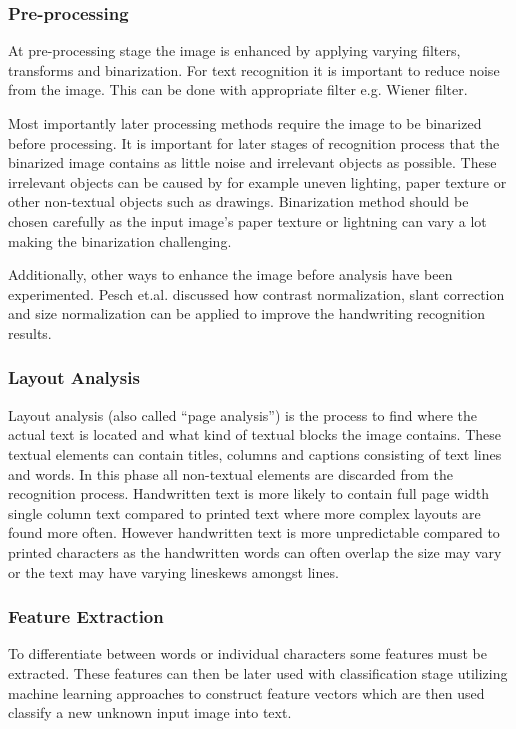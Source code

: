 \documentclass{article}
\begin{document}
      \subsubsection{Pre-processing}
        At pre-processing stage the image is enhanced by applying varying filters, transforms and binarization. For text recognition it is important to reduce noise from the image. This can be done with appropriate filter e.g. Wiener filter.

        Most  importantly later processing methods require the image to be binarized before processing. It is important for later stages of recognition process that the binarized image contains as little noise and irrelevant objects as possible.  These irrelevant objects can be caused by for example uneven lighting, paper texture or other non-textual objects such as drawings. Binarization method should be chosen carefully as the input image's paper texture or lightning can vary a lot making the binarization challenging.

        Additionally, other ways to enhance the image before analysis have been experimented. Pesch et.al. discussed how contrast normalization, slant correction and size normalization can be applied to improve the handwriting recognition results. \cite{Pesch2012}

      \subsubsection{Layout Analysis}
        Layout analysis (also called ``page analysis'') is the process to find where the actual text is located and what kind of textual blocks the image contains. These textual elements can contain titles, columns and captions consisting of text lines and words. In this phase all non-textual elements are discarded from the recognition process. Handwritten text is more likely to contain full page width single column text compared to printed text where more complex layouts are found more often. However handwritten text is more unpredictable compared to printed characters as the handwritten words can often overlap the size may vary or the text may have varying lineskews amongst lines.

      \subsubsection{Feature Extraction}
        To differentiate between words or individual characters some features must be extracted. These features can then be later used with classification stage utilizing machine learning approaches to construct feature vectors which are then used classify a new unknown input image into text.
\end{document}
